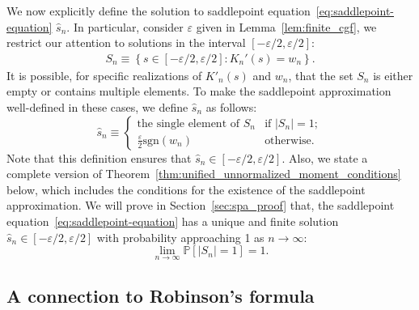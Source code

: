 \documentclass[12pt]{article}
\theoremstyle{definition}
\def\P{\mathbb{P}}
\def\P{\mathbb{P}}
\renewcommand{\P}{\mathbb{P}}							%
\begin{document}
We now explicitly define the solution to saddlepoint equation~\eqref{eq:saddlepoint-equation} $\hat s_n$. In particular, consider $\varepsilon$ given in Lemma~\ref{lem:finite_cgf}, we restrict our attention to solutions in the interval $[-\varepsilon/2, \varepsilon/2]$:
\begin{align*}
S_n\equiv \left\{s\in [-\varepsilon/2,\varepsilon/2]:K_n'(s)=w_n\right\}.
\end{align*}
It is possible, for specific realizations of $K'_n(s)$ and $w_n$, that the set $S_n$ is either empty or contains multiple elements. To make the saddlepoint approximation well-defined in these cases, we define $\hat s_n$ as follows:
\begin{equation}\label{eq:def_s_n}
\hat s_n \equiv 
\begin{cases}
\text{the single element of }S_n & \text{if } |S_n|=1; \\
\frac{\varepsilon}{2}\mathrm{sgn}(w_n) & \text{otherwise}.
\end{cases}
\end{equation}
Note that this definition ensures that $\hat s_n \in [-\varepsilon/2, \varepsilon/2]$. Also, we state a complete version of Theorem~\ref{thm:unified_unnormalized_moment_conditions} below, which includes the conditions for the existence of the saddlepoint approximation. We will prove in Section~\ref{sec:spa_proof} that, the saddlepoint equation~\eqref{eq:saddlepoint-equation} has a unique and finite solution $\hat s_n \in [-\varepsilon/2, \varepsilon/2]$ with probability approaching 1 as $n \rightarrow \infty$:
\begin{equation}
\lim_{n \rightarrow \infty} \P[|S_n| = 1] = 1.
\label{eq:unique_solution_in_probability}
\end{equation}


\subsection{A connection to Robinson's formula \citep{Robinson1982}}\label{sec:unconditional-spa-robinson}
\end{document}
